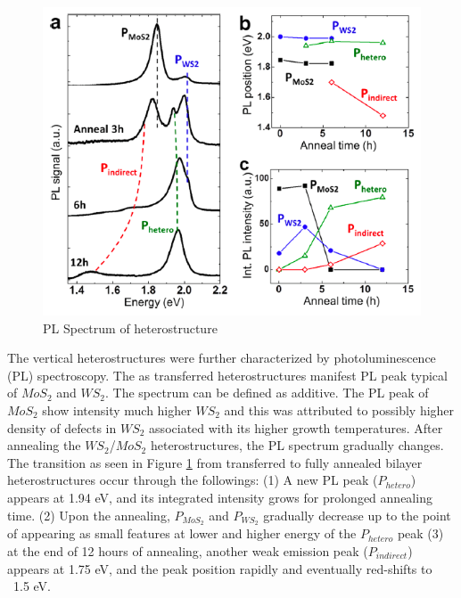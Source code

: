 \begin{figure}[h]
	\begin{center}
		\includegraphics[scale=1]{Heterostructures/HeterostructurePLSpectrumIntro.png}
		\caption{PL Spectrum of heterostructure}
		\label{fig:HeterostructurePLSpectrumIntro}
	\end{center}
\end{figure}

The vertical heterostructures were further characterized by photoluminescence (PL) spectroscopy.
The as transferred heterostructures manifest PL peak typical of $MoS_2$ and $WS_2$. The spectrum can be defined as additive. The PL peak of $MoS_2$ show intensity much higher $WS_2$ and this was attributed to possibly higher density of defects in $WS_2$ associated with its higher growth temperatures. After annealing the $WS_2$/$MoS_2$ heterostructures, the PL spectrum gradually changes. The transition as seen in Figure \ref{fig:HeterostructurePLSpectrumIntro} from transferred to fully annealed bilayer heterostructures occur through the followings: (1) A new PL peak ($P_{hetero}$) appears at 1.94 eV, and its integrated intensity grows for prolonged annealing time. (2) Upon the annealing, $P_{MoS_2}$ and $P_{WS_2}$ gradually decrease up to the point of appearing as small features at lower and higher energy of the $P_{hetero}$ peak (3) at the end of 12 hours of annealing, another weak emission peak ($P_{indirect}$) appears at 1.75 eV, and the peak position rapidly and eventually red-shifts to ~1.5 eV. 

